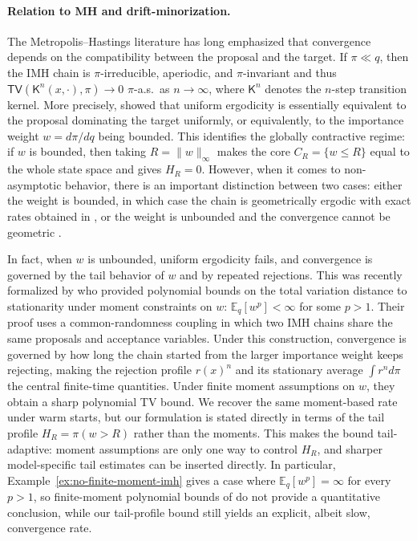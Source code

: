 \documentclass[10pt, journal]{IEEEtran}
\newcommand{\E}{\mathbb{E}}
\newcommand{\sK}{\mathsf{K}}
\newcommand{\TV}{\mathsf{TV}}
\begin{document}
\paragraph{Relation to MH and drift-minorization.}
The Metropolis--Hastings literature has long emphasized that convergence depends on the compatibility between the proposal and the target. 
If $\pi\ll q$, then the IMH chain is $\pi$-irreducible, aperiodic, and $\pi$-invariant and thus $\TV(\sK^n(x, \cdot), \pi)\to 0$ $\pi$-a.s.\ as $n\to \infty$, where $\sK^n$ denotes the $n$-step transition kernel.  More precisely, \cite{MengersonTweedie} showed that uniform ergodicity is essentially equivalent to the proposal dominating the target uniformly, or equivalently, to the importance weight $w=d\pi/dq$ being bounded. This identifies the globally contractive regime: if $w$ is bounded, then taking $R=\|w\|_\infty$ makes the core $C_R=\{w\le R\}$ equal to the whole state space and gives $H_R=0$. 
However, when it comes to non-asymptotic behavior, there is an important distinction between two cases: either the weight is bounded, in which case the chain is geometrically ergodic with exact rates obtained in \cite{wang2022exact,brown2024exact}, or the weight is unbounded and the convergence cannot be geometric \cite{roberts2011quantitative,Andrieu_IMH,deligiannidis2024importance}. 

In fact, when $w$ is unbounded, uniform ergodicity fails, and convergence is governed by the tail behavior of $w$ and by repeated rejections. This was recently formalized by \cite{deligiannidis2024importance} who provided polynomial bounds on the total variation distance to stationarity under moment constraints on $w$: $\E_q[w^p]<\infty$ for some $p>1$. 
Their proof uses a common-randomness coupling in which two IMH chains share the same proposals and acceptance variables. Under this construction, convergence is governed by how long the chain started from the larger importance weight keeps rejecting, making the rejection profile $r(x)^n$ and its stationary average $\int r^nd\pi$ the central finite-time quantities. Under finite moment assumptions on $w$, they obtain a sharp polynomial TV bound. We recover the same moment-based rate under warm starts, but our formulation is stated directly in terms of the tail profile $H_R=\pi(w>R)$ rather than the moments. This makes the bound tail-adaptive: moment assumptions are only one way to control $H_R$, and sharper model-specific tail estimates can be inserted directly. In particular, Example~\ref{ex:no-finite-moment-imh} gives a case where $\mathbb E_q[w^p]=\infty$ for every $p>1$, so finite-moment polynomial bounds of \cite{deligiannidis2024importance} do not provide a quantitative conclusion, while our tail-profile bound still yields an explicit, albeit slow, convergence rate.
\end{document}
